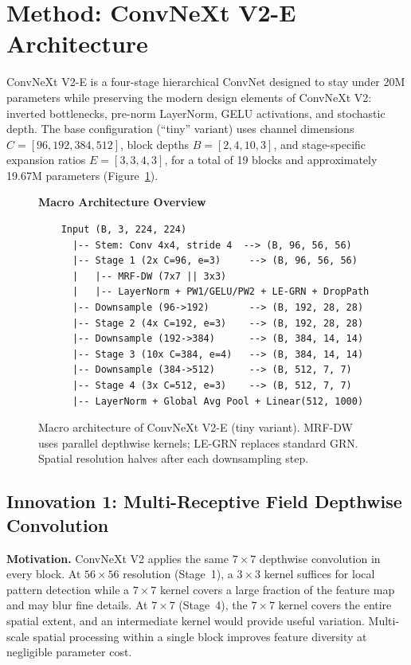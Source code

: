 \documentclass{article}
\begin{document}
\section{Method: ConvNeXt V2-E Architecture}
\label{sec:method}

ConvNeXt V2-E is a four-stage hierarchical ConvNet designed to stay
under 20M parameters while preserving the modern design elements of
ConvNeXt V2: inverted bottlenecks, pre-norm LayerNorm, GELU
activations, and stochastic depth.  The base configuration (``tiny''
variant) uses channel dimensions $C = [96, 192, 384, 512]$, block
depths $B = [2, 4, 10, 3]$, and stage-specific expansion ratios
$E = [3, 3, 4, 3]$, for a total of 19 blocks and approximately
19.67M parameters (Figure~\ref{fig:architecture}).

\begin{figure}[h]
  \centering
  \textbf{Macro Architecture Overview}
  \vspace{4pt}
  \begin{verbatim}
    Input (B, 3, 224, 224)
      |-- Stem: Conv 4x4, stride 4  --> (B, 96, 56, 56)
      |-- Stage 1 (2x C=96, e=3)     --> (B, 96, 56, 56)
      |   |-- MRF-DW (7x7 || 3x3)
      |   |-- LayerNorm + PW1/GELU/PW2 + LE-GRN + DropPath
      |-- Downsample (96->192)       --> (B, 192, 28, 28)
      |-- Stage 2 (4x C=192, e=3)    --> (B, 192, 28, 28)
      |-- Downsample (192->384)      --> (B, 384, 14, 14)
      |-- Stage 3 (10x C=384, e=4)   --> (B, 384, 14, 14)
      |-- Downsample (384->512)      --> (B, 512, 7, 7)
      |-- Stage 4 (3x C=512, e=3)    --> (B, 512, 7, 7)
      |-- LayerNorm + Global Avg Pool + Linear(512, 1000)
  \end{verbatim}
  \caption{Macro architecture of ConvNeXt V2-E (tiny variant).
           MRF-DW uses parallel depthwise kernels; LE-GRN replaces
           standard GRN.  Spatial resolution halves after each
           downsampling step.}
  \label{fig:architecture}
\end{figure}

\subsection{Innovation 1: Multi-Receptive Field Depthwise Convolution}

\textbf{Motivation.}  ConvNeXt V2 applies the same $7\times7$ depthwise
convolution in every block.  At $56\times56$ resolution (Stage~1), a
$3\times3$ kernel suffices for local pattern detection while a
$7\times7$ kernel covers a large fraction of the feature map and may
blur fine details.  At $7\times7$ (Stage~4), the $7\times7$ kernel
covers the entire spatial extent, and an intermediate kernel would
provide useful variation.  Multi-scale spatial processing within a
single block improves feature diversity at negligible parameter cost.
\end{document}
